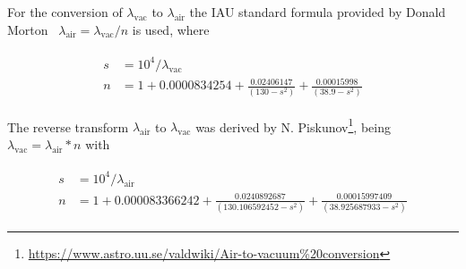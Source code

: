 For the conversion of $\lambda_\textrm{vac}$ to $\lambda_\textrm{air}$ the \ac{IAU} standard formula provided by Donald Morton~\cite{mor00} $\lambda_\textrm{air}=\lambda_\textrm{vac}/n$ is used, where

\begin{eqnarray}\label{eq:air2vac}
\left.\begin{aligned}
    s &=10^4 / \lambda_{\textrm{vac}}\\
    n &= 1+0.0000834254 + \frac{0.02406147}{(130 - s^2)} + \frac{0.00015998}{(38.9 - s^2)}
\end{aligned}\right.
\end{eqnarray}

The reverse transform $\lambda_\textrm{air}$ to $\lambda_\textrm{vac}$ was derived by N. Piskunov\footnote{\url{https://www.astro.uu.se/valdwiki/Air-to-vacuum\%20conversion}}, being $\lambda_\textrm{vac}=\lambda_\textrm{air}*n$ with 

\begin{eqnarray}\label{eq:vac2air}
\left.\begin{aligned}
    s&=10^4 / \lambda_{\textrm{air}}\\
    n&=1 + 0.000083366242 + \frac{0.0240892687}{(130.106592452 - s^2)} + \frac{0.00015997409}{(38.925687933 - s^2)}
\end{aligned}\right.
\end{eqnarray}

